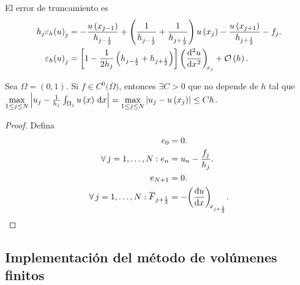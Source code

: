 \begin{frame}
	El error de truncamiento es
	\begin{align*}
		h_{j}
		\varepsilon_{h}
		{\left(u\right)}_{j} & =
		-\frac{u\left(x_{j-1}\right)}{h_{j-\frac{1}{2}}}+
		\left(
		\frac{1}{h_{j-\frac{1}{2}}}+\frac{1}{h_{j+\frac{1}{2}}}
		\right)
		u\left(x_{j}\right)-
		\frac{u\left(x_{j+1}\right)}{h_{j+\frac{1}{2}}}-
		f_{j}.                   \\
		\varepsilon_{h}
		{\left(u\right)}_{j} & =
		\left[
			1-
			\frac{1}{2h_{j}}
			\left(
			h_{j-\frac{1}{2}}+
			h_{j+\frac{1}{2}}
			\right)
			\right]
		\diff[2]{u}{x}[x_{j}]+
		\mathcal{O}\left(h\right).
	\end{align*}

	\begin{theorem}
		Sea $\Omega=\left(0,1\right)$.
		Si $f\in C^{0}\big(\overline{\Omega}\big)$, entonces
		$\exists C>0$ que no depende de $h$ tal que
		\begin{math}
			\max\limits_{1\leq j\leq N}
			\left|
			u_{j}-
			\frac{1}{h_{j}}
			\int_{\Omega_{j}}
			u\left(x\right)\dl x
			\right|=
			\max\limits_{1\leq j\leq N}
			\left|
			u_{j}-
			u\left(x_{j}\right)
			\right|\leq
			Ch
		\end{math}.
	\end{theorem}

	\begin{proof}
		Defina
		\begin{align*}
			e_{0}                        & =0. \\
			\forall j=1,\dotsc,N:
			e_{n}                        & =
			u_{n}-\frac{f_{j}}{h_{j}}.         \\
			e_{N+1}                      & =0. \\
			\forall j=1,\dotsc,N:
			\overline{F}_{j+\frac{1}{2}} & =
			-\diff{u}{x}[x_{j+\frac{1}{2}}].
		\end{align*}
	\end{proof}
\end{frame}

\subsection{Implementación del método de volúmenes finitos}


